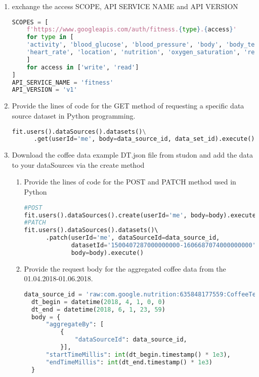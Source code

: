\documentclass{homework}
\begin{document}
\exercise
\begin{enumerate}
	\item  exchange the access SCOPE, API SERVICE NAME and API VERSION
	\begin{lstlisting}[language=Python, caption=SCOPE API SERVICE NAME and API VERSION, basicstyle=\tiny]
SCOPES = [
    f'https://www.googleapis.com/auth/fitness.{type}.{access}'
    for type in [
    'activity', 'blood_glucose', 'blood_pressure', 'body', 'body_temperature',
    'heart_rate', 'location', 'nutrition', 'oxygen_saturation', 'reproductive_health', 'sleep'
    ]
    for access in ['write', 'read']
]
API_SERVICE_NAME = 'fitness'
API_VERSION = 'v1'
		\end{lstlisting}
	\item Provide the lines of code for the GET method of requesting a specific data source dataset in Python programming.
	\begin{lstlisting}[language=Python, caption=GET method of requesting a specific data source dataset, basicstyle=\small]
  fit.users().dataSources().datasets()\
      .get(userId='me', body=data_source_id, data_set_id).execute()
		\end{lstlisting}
	\item Download the coffee data example DT.json file from studon and add the data to your dataSources via the create method
	\begin{enumerate}[label=\alph*)]
		\item Provide the lines of code for the POST and PATCH method used in Python 
	\begin{lstlisting}[language=Python, caption=lines of code for the POST and PATCH methodt, basicstyle=\small]
#POST
fit.users().dataSources().create(userId='me', body=body).execute() 
#PATCH
fit.users().dataSources().datasets()\ 
      .patch(userId='me', dataSourceId=data_source_id,
             datasetId='1500407287000000000-1606687074000000000', 
             body=body).execute()
		\end{lstlisting}
	\item Provide the request body for the aggregated coffee data from the 01.04.2018-01.06.2018.
	\begin{lstlisting}[language=Python, caption= the request body for the aggregated coffee data from the 01.04.2018-01.06.2018, basicstyle=\tiny]
  data_source_id = 'raw:com.google.nutrition:635848177559:CoffeeTestSource'
  dt_begin = datetime(2018, 4, 1, 0, 0)
  dt_end = datetime(2018, 6, 1, 23, 59)
  body = {
      "aggregateBy": [
          {
              "dataSourceId": data_source_id,
          }],
      "startTimeMillis": int(dt_begin.timestamp() * 1e3),
      "endTimeMillis": int(dt_end.timestamp() * 1e3)
  }
		\end{lstlisting}
	\end{enumerate}
\end{enumerate}
\end{document}
